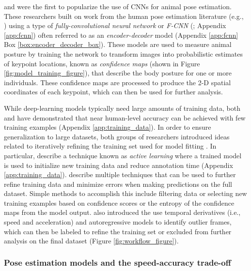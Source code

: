 \documentclass[11pt,a4paper,oneside]{article}
\begin{document}
\cite{mathis2018deeplabcut} and \cite{pereira2019fast} were the first to popularize the use of CNNs for animal pose estimation. These researchers built on work from the human pose estimation literature (e.g., \citealt{andriluka14cvpr,insafutdinov2016deepercut,newell2016}) using a type of \textit{fully-convolutional neural network} or \textit{F-CNN} (\citealt{long2015fully}; Appendix \ref{app:fcnn}) often referred to as an \textit{encoder-decoder} model (Appendix \ref{app:fcnn} Box \ref{box:encoder_decoder_box}). These models are used to measure animal posture by training the network to transform images into probabilistic estimates of keypoint locations, known as \textit{confidence maps} (shown in Figure \ref{fig:model_training_figure}), that describe the body posture for one or more individuals. These confidence maps are processed to produce the 2-D spatial coordinates of each keypoint, which can then be used for further analysis. 

While deep-learning models typically need large amounts of training data, both \cite{mathis2018deeplabcut} and \cite{pereira2019fast} have demonstrated that near human-level accuracy can be achieved with few training examples (Appendix \ref{app:training_data}). In order to ensure generalization to large datasets, both groups of researchers introduced ideas related to iteratively refining the training set used for model fitting \citep{mathis2018deeplabcut, pereira2019fast}. In particular, \cite{pereira2019fast} describe a technique known as \textit{active learning} where a trained model is used to initialize new training data and reduce annotation time (Appendix \ref{app:training_data}). \cite{mathis2018deeplabcut} describe multiple techniques that can be used to further refine training data and minimize errors when making predictions on the full dataset. Simple methods to accomplish this include filtering data or selecting new training examples based on confidence scores or the entropy of the confidence maps from the model output. \cite{nath2018} also introduced the use temporal derivatives (i.e., speed and acceleration) and autoregressive models to identify outlier frames, which can then be labeled to refine the training set or excluded from further analysis on the final dataset (Figure \ref{fig:workflow_figure}).

\subsubsection{Pose estimation models and the speed-accuracy trade-off}
\end{document}
